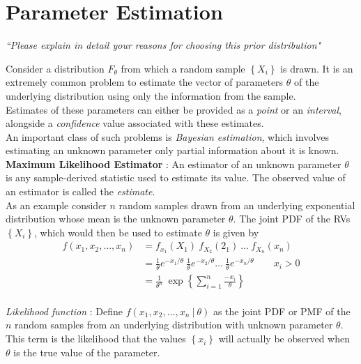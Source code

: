 \chapter{Parameter Estimation}


\begin{flushright}
	\textit{``Please explain in detail your reasons for choosing this prior distribution"} \\
\end{flushright}

Consider a distribution $ F_\theta $ from which a random sample $ \left\{X_i\right\} $ is drawn. It is an extremely common problem to estimate the vector of parameters $ \theta $ of the underlying distribution using only the information from the sample.\\

Estimates of these parameters can either be provided as a \textit{point} or an \textit{interval}, alongside a \textit{confidence} value associated with these estimates. \\

An important class of such problems is \textit{Bayesian estimation}, which involves estimating an unknown parameter only partial information about it is known. \\

\textbf{Maximum Likelihood Estimator} : An estimator of an unknown parameter $ \theta $ is any sample-derived statistic used to estimate its value. The observed value of an estimator is called the \textit{estimate}. \\

As an example consider $ n $ random samples drawn from an underlying exponential distribution whose mean is the unknown parameter $ \theta $. The joint PDF of the RVs $ \left\{X_i\right\} $, which would then be used to estimate $ \theta $ is given by \\

\begin{align}
	f(x_1, x_2, \dots, x_n) &= f_{x_1} (X_1)\ f_{X_2} (2_1)\ \dots\  f_{X_n} (x_n) \nonumber \\
	&= \frac{1}{\theta} e^{-x_1/\theta} \ \frac{1}{\theta} e^{-x_2/\theta} \dots \ \frac{1}{\theta} e^{-x_n/\theta} \qquad x_i > 0 \nonumber \\
	&= \frac{1}{\theta^n}\ \exp \left\{ \sum_{i=1}^{n} \frac{-x_i}{\theta} \right\}
\end{align} \\

\textit{Likelihood function} : Define $ f(x_1, x_2,\dots,x_n\ |\ \theta) $ as the joint PDF or PMF of the $ n $ random samples from an underlying distribution with unknown parameter $ \theta $. This term is the likelihood that the values $ \left\{ x_i \right\} $ will actually be observed when $ \theta $ is the true value of the parameter. \\

